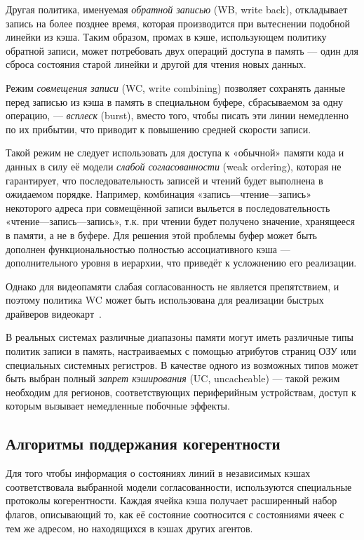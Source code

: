 Другая политика, именуемая \textit{обратной записью} (WB, \abbr write back), откладывает запись на более позднее время, которая производится при вытеснении подобной линейки из кэша. Таким образом, промах в кэше, использующем политику обратной записи, может потребовать двух операций доступа в память — один для сброса состояния старой линейки и другой для чтения новых данных.

Режим \textit{совмещения записи} (WC, \abbr write combining) позволяет сохранять данные перед записью из кэша в память в специальном буфере, сбрасываемом за одну операцию, — \textit{всплеск} (\abbr burst), вместо того, чтобы  писать эти линии немедленно по их прибытии, что приводит к повышению средней скорости записи. %

Такой режим не следует использовать для доступа к «обычной» памяти кода и данных в силу её модели \textit{слабой согласованности} (\abbr weak ordering), которая не гарантирует, что последовательность записей и чтений будет выполнена в ожидаемом порядке. Например, комбинация «запись—чтение—запись» некоторого адреса при совмещённой записи выльется в последовательность «чтение—запись—запись», т.к. при чтении будет получено значение, хранящееся в памяти, а не в буфере. Для решения этой проблемы буфер может быть дополнен функциональностью полностью ассоциативного кэша — дополнительного уровня в иерархии, что приведёт к усложнению его реализации.

Однако для видеопамяти слабая согласованность не является препятствием, и поэтому политика WC может быть использована для реализации быстрых драйверов видеокарт~\cite{wc-guidelines}.

В реальных системах различные диапазоны памяти могут иметь различные типы политик записи в память, настраиваемых с помощью атрибутов страниц ОЗУ или специальных системных регистров. В качестве одного из возможных типов может быть выбран полный \textit{запрет кэширования} (UC, \abbr uncacheable) — такой режим необходим для регионов, соответствующих периферийным устройствам, доступ к которым вызывает немедленные побочные эффекты.

\subsection[Алгоритмы поддержания когерентности]{Алгоритмы поддержания когерентности}

Для того чтобы информация о состояниях линий в независимых кэшах соответствовала выбранной модели согласованности, используются специальные протоколы когерентности. Каждая ячейка кэша получает расширенный набор флагов, описывающий то, как её состояние соотносится с состояниями ячеек с тем же адресом, но находящихся в кэшах других агентов.

